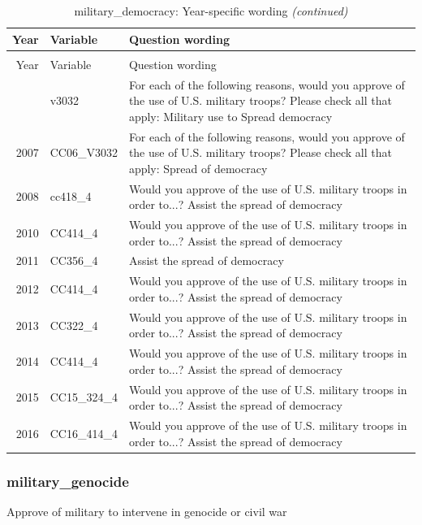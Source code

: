 \documentclass[12pt]{article}
\begin{document}
\begin{longtable}[t]{rl>{\raggedright\arraybackslash}p{10cm}}
\caption{\label{tab:unnamed-chunk-4}military\_democracy: Year-specific wording}\\
\toprule
Year & Variable & Question wording\\
\midrule
\endfirsthead
\caption[]{military\_democracy: Year-specific wording \textit{(continued)}}\\
\toprule
Year & Variable & Question wording\\
\midrule
\endhead
\
\endfoot
\bottomrule
\endlastfoot
2006 & v3032 & For each of the following reasons, would you approve of the use of U.S. military troops? Please check all that apply: Military use to Spread democracy\\
2007 & CC06\_V3032 & For each of the following reasons, would you approve of the use of U.S. military troops? Please check all that apply: Spread of democracy\\
2008 & cc418\_4 & Would you approve of the use of U.S. military troops in order to...? Assist the spread of democracy\\
2010 & CC414\_4 & Would you approve of the use of U.S. military troops in order to...? Assist the spread of democracy\\
2011 & CC356\_4 & Assist the spread of democracy\\
2012 & CC414\_4 & Would you approve of the use of U.S. military troops in order to...? Assist the spread of democracy\\
2013 & CC322\_4 & Would you approve of the use of U.S. military troops in order to...? Assist the spread of democracy\\
2014 & CC414\_4 & Would you approve of the use of U.S. military troops in order to...? Assist the spread of democracy\\
2015 & CC15\_324\_4 & Would you approve of the use of U.S. military troops in order to...? Assist the spread of democracy\\
2016 & CC16\_414\_4 & Would you approve of the use of U.S. military troops in order to...? Assist the spread of democracy\\*
\end{longtable}

\subsubsection{military\_genocide}\label{military_genocide}

Approve of military to intervene in genocide or civil war
\end{document}
